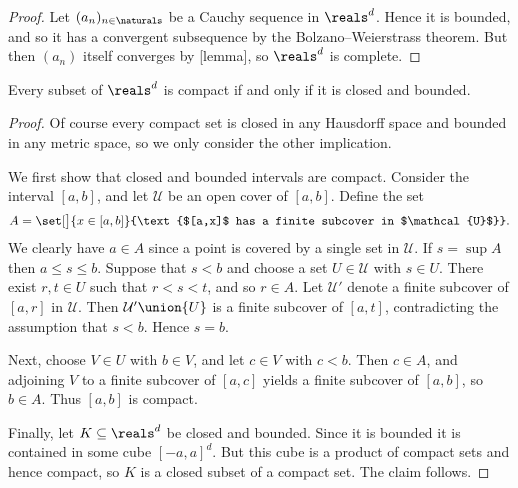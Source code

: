 \documentclass[article, a4paper, 11pt, oneside]{memoir}
\numberwithin{equation}{chapter}
\newcommand{\calU}{\mathcal{U}}
\begin{document}
\begin{proof}
    Let $(a_n)_{n\in\naturals}$ be a Cauchy sequence in $\reals^d$. Hence it is bounded, and so it has a convergent subsequence by the Bolzano--Weierstrass theorem. But then $(a_n)$ itself converges by [lemma], so $\reals^d$ is complete.
\end{proof}


\begin{theorem}
    Every subset of $\reals^d$ is compact if and only if it is closed and bounded.
\end{theorem}

\begin{proof}
    Of course every compact set is closed in any Hausdorff space and bounded in any metric space, so we only consider the other implication.
    
    We first show that closed and bounded intervals are compact. Consider the interval $[a,b]$, and let $\calU$ be an open cover of $[a,b]$. Define the set
    \begin{equation*}
        A
            = \set[\big]{x \in [a,b]}{\text{$[a,x]$ has a finite subcover in $\calU$}}.
    \end{equation*}
    We clearly have $a \in A$ since a point is covered by a single set in $\calU$. If $s = \sup A$ then $a \leq s \leq b$. Suppose that $s < b$ and choose a set $U \in \calU$ with $s \in U$. There exist $r,t \in U$ such that $r < s < t$, and so $r \in A$. Let $\calU'$ denote a finite subcover of $[a,r]$ in $\calU$. Then $\calU' \union \{U\}$ is a finite subcover of $[a,t]$, contradicting the assumption that $s < b$. Hence $s = b$.

    Next, choose $V \in U$ with $b \in V$, and let $c \in V$ with $c < b$. Then $c \in A$, and adjoining $V$ to a finite subcover of $[a,c]$ yields a finite subcover of $[a,b]$, so $b \in A$. Thus $[a,b]$ is compact.

    Finally, let $K \subseteq \reals^d$ be closed and bounded. Since it is bounded it is contained in some cube $[-a,a]^d$. But this cube is a product of compact sets and hence compact, so $K$ is a closed subset of a compact set. The claim follows.
\end{proof}



\end{document}
